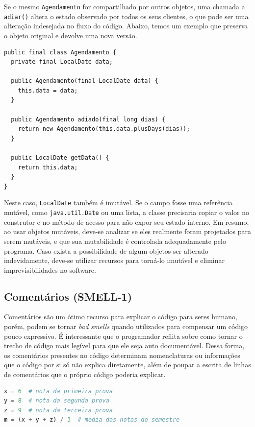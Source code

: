 \documentclass[12pt,a4paper]{article}
\newcommand{\smell}[1]{\textit{#1}}
\begin{document}
Se o mesmo \texttt{Agendamento} for compartilhado por outros objetos, uma chamada a \texttt{adiar()} altera o estado observado por todos os seus clientes, o que pode ser uma alteração indesejada no fluxo do código. Abaixo, temos um exemplo que preserva o objeto original e devolve uma nova versão.

\begin{lstlisting}[caption={Depois: objeto imutável},label={lst:mutable-after}]
public final class Agendamento {
  private final LocalDate data;

  public Agendamento(final LocalDate data) {
    this.data = data;
  }

  public Agendamento adiado(final long dias) {
    return new Agendamento(this.data.plusDays(dias));
  }

  public LocalDate getData() {
    return this.data;
  }
}
\end{lstlisting}

Neste caso, \texttt{LocalDate} também é imutável. Se o campo fosse uma referência mutável, como \texttt{java.util.Date} ou uma lista, a classe precisaria copiar o valor no construtor e no método de acesso para não expor seu estado interno. Em resumo, ao usar objetos mutáveis, deve-se analizar se eles realmente foram projetados para serem mutáveis, e que sua mutabilidade é controlada adequadamente pelo programa. Caso exista a possibilidade de algum objetos ser alterado indevidamente, deve-se utilizar recursos para torná-lo imutável e eliminar imprevisibilidades no software.


\subsection{Comentários (SMELL-1)}

Comentários são um ótimo recurso para explicar o código para seres humano, porém, podem se tornar \smell{bad smells} quando utilizados para compensar um código pouco expressivo. É interessante que o programador reflita sobre como tornar o trecho de código mais legível para que ele seja auto documentável. Dessa forma, os comentários presentes no código determinam nomenclaturas ou informações que o código por si só não explica diretamente, além de poupar a escrita de linhas de comentários que o próprio código poderia explicar.

\begin{lstlisting}[language=Python,caption={Comentário que encobre código pouco expressivo},label={lst:comments-before}]
x = 6  # nota da primeira prova
y = 8  # nota da segunda prova
z = 9  # nota da terceira prova
m = (x + y + z) / 3  # media das notas do semestre
\end{lstlisting}
\end{document}
